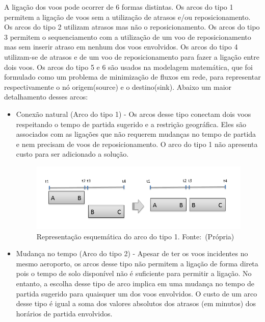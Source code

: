 A ligação dos voos pode ocorrer de 6 formas distintas. Os arcos do tipo 1
permitem a ligação de voos sem a utilização de atrasos e/ou reposicionamento.
Os arcos do tipo 2 utilizam atrasos mas não o reposicionamento. Os arcos do
tipo 3 permitem o sequenciamento com a utilização de um voo de reposicionamento
mas sem inserir atraso em nenhum dos voos envolvidos. Os arcos do tipo 4
utilizam-se de atrasos e de um voo de reposicionamento para fazer a ligação
entre dois voos. Os arcos do tipo 5 e 6 são usados na modelagem matemática, que
foi formulado como um problema de minimização de fluxos em rede, para
representar respectivamente o nó origem(source) e o destino(sink). Abaixo um
maior detalhamento desses arcos:
  
\begin{itemize}
\item Conexão natural (Arco do tipo 1) - Os arcos desse tipo conectam dois voos
respeitando o tempo de partida sugerido e a restrição geográfica. Eles são
associados com as ligações que não requerem mudanças no tempo de partida e nem
precisam de voos de reposicionamento. O arco do tipo 1 não apresenta custo para
ser adicionado a solução.

\begin{figure}[ht]
	\caption{Representação esquemática do arco do tipo 1. \newline \mbox{Fonte:
	(Própria)}}
	\label{fig:arc1}
	\includegraphics[scale=0.35]{./img/arc1}
	
\end{figure}

\item Mudança no tempo (Arco do tipo 2) - Apesar de ter os voos incidentes no
mesmo aeroporto, os arcos desse tipo não permitem a ligação de forma direta
pois o tempo de solo disponível não é suficiente para permitir a ligação. No
entanto, a escolha desse tipo de arco implica em uma mudança no tempo de
partida sugerido para quaisquer um dos voos envolvidos. O custo de um arco
desse tipo é igual a soma dos valores absolutos dos atrasos (em minutos) dos
horários de partida envolvidos.
      

\end{itemize}
